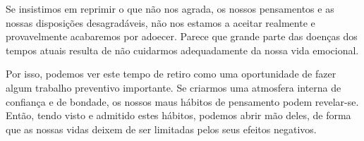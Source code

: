 Se insistimos em reprimir o que não nos agrada, os nossos pensamentos e
as nossas disposições desagradáveis, não nos estamos a aceitar realmente
e provavelmente acabaremos por adoecer. Parece que grande parte das
doenças dos tempos atuais resulta de não cuidarmos adequadamente da
nossa vida emocional.

Por isso, podemos ver este tempo de retiro como uma oportunidade de
fazer algum trabalho preventivo importante. Se criarmos uma atmosfera
interna de confiança e de bondade, os nossos maus hábitos de pensamento
podem revelar-se. Então, tendo visto e admitido estes hábitos, podemos
abrir mão deles, de forma que as nossas vidas deixem de ser limitadas
pelos seus efeitos negativos.

